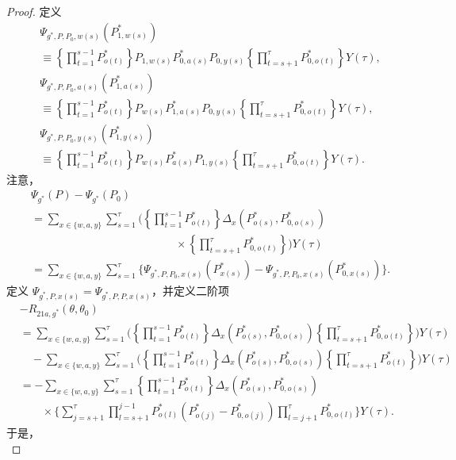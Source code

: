 \begin{proof}
定义
\[
\begin{aligned}
&\Psi_{g^*,P,P_0,w(s)}(P^*_{1,w(s)})\\
&\equiv\left\{\prod_{t=1}^{s-1}P^*_{o(t)}\right\}
 P_{1,w(s)}P^*_{0,a(s)}P_{0,y(s)}
 \left\{\prod_{t=s+1}^{\tau}P^*_{0,o(t)}\right\}Y(\tau),\\
&\Psi_{g^*,P,P_0,a(s)}(P^*_{1,a(s)})\\
&\equiv\left\{\prod_{t=1}^{s-1}P^*_{o(t)}\right\}
 P_{w(s)}P^*_{1,a(s)}P_{0,y(s)}
 \left\{\prod_{t=s+1}^{\tau}P^*_{0,o(t)}\right\}Y(\tau),\\
&\Psi_{g^*,P,P_0,y(s)}(P^*_{1,y(s)})\\
&\equiv\left\{\prod_{t=1}^{s-1}P^*_{o(t)}\right\}
 P_{w(s)}P^*_{a(s)}P_{1,y(s)}
 \left\{\prod_{t=s+1}^{\tau}P^*_{0,o(t)}\right\}Y(\tau).
\end{aligned}
\]
注意，
\[
\begin{aligned}
&\Psi_{g^*}(P)-\Psi_{g^*}(P_0)\\
&=\sum_{x\in\{w,a,y\}}\sum_{s=1}^{\tau}
 \Biggl(\left\{\prod_{t=1}^{s-1}P^*_{o(t)}\right\}
 \Delta_x(P^*_{o(s)},P^*_{0,o(s)})\\
&\hspace{13em}\times\left\{\prod_{t=s+1}^{\tau}P^*_{0,o(t)}\right\}\Biggr)Y(\tau)\\
&=\sum_{x\in\{w,a,y\}}\sum_{s=1}^{\tau}
 \bigl\{\Psi_{g^*,P,P_0,x(s)}(P^*_{x(s)})
 -\Psi_{g^*,P,P_0,x(s)}(P^*_{0,x(s)})\bigr\}.
\end{aligned}
\]
定义 $\Psi_{g^*,P,x(s)}=\Psi_{g^*,P,P,x(s)}$，并定义二阶项
\[
\begin{aligned}
&-R_{21a,g^*}(\theta,\theta_0)\\
&=\sum_{x\in\{w,a,y\}}\sum_{s=1}^{\tau}
 \Biggl(\left\{\prod_{t=1}^{s-1}P^*_{o(t)}\right\}
 \Delta_x(P^*_{o(s)},P^*_{0,o(s)})
 \left\{\prod_{t=s+1}^{\tau}P^*_{0,o(t)}\right\}\Biggr)Y(\tau)\\
&\quad-\sum_{x\in\{w,a,y\}}\sum_{s=1}^{\tau}
 \Biggl(\left\{\prod_{t=1}^{s-1}P^*_{o(t)}\right\}
 \Delta_x(P^*_{o(s)},P^*_{0,o(s)})
 \left\{\prod_{t=s+1}^{\tau}P^*_{o(t)}\right\}\Biggr)Y(\tau)\\
&=-\sum_{x\in\{w,a,y\}}\sum_{s=1}^{\tau}
 \left\{\prod_{t=1}^{s-1}P^*_{o(t)}\right\}
 \Delta_x(P^*_{o(s)},P^*_{0,o(s)})\\
&\qquad\times\Biggl\{\sum_{j=s+1}^{\tau}
 \prod_{l=s+1}^{j-1}P^*_{o(l)}(P^*_{o(j)}-P^*_{0,o(j)})
 \prod_{l=j+1}^{\tau}P^*_{0,o(l)}\Biggr\}Y(\tau).
\end{aligned}
\]
于是，
\[
\]
\end{proof}
